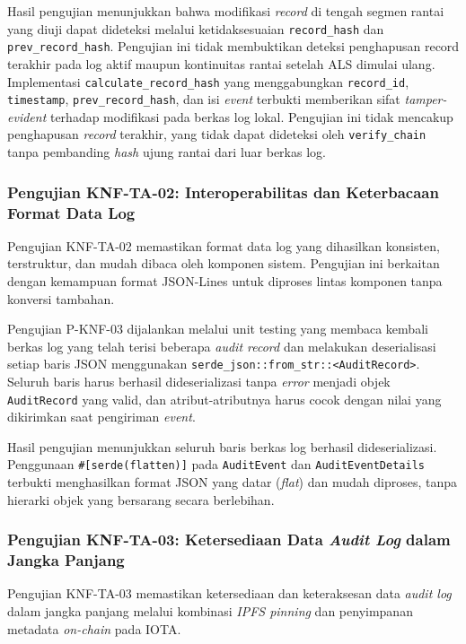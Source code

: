Hasil pengujian menunjukkan bahwa modifikasi \textit{record} di tengah segmen rantai yang diuji dapat dideteksi melalui ketidaksesuaian \texttt{record\_hash} dan \texttt{prev\_record\_hash}. Pengujian ini tidak membuktikan deteksi penghapusan record terakhir pada log aktif maupun kontinuitas rantai setelah ALS dimulai ulang. Implementasi \texttt{calculate\_record\_hash} yang menggabungkan
\texttt{record\_id}, \texttt{timestamp}, \texttt{prev\_record\_hash}, dan isi
\textit{event} terbukti memberikan sifat \textit{tamper-evident} terhadap
modifikasi pada berkas log lokal. Pengujian ini tidak mencakup penghapusan
\textit{record} terakhir, yang tidak dapat dideteksi oleh \texttt{verify\_chain}
tanpa pembanding \textit{hash} ujung rantai dari luar berkas log.

\subsubsection{Pengujian KNF-TA-02: Interoperabilitas dan Keterbacaan Format Data Log}

Pengujian KNF-TA-02 memastikan format data log yang dihasilkan konsisten, terstruktur, dan mudah dibaca oleh komponen sistem. Pengujian ini berkaitan dengan kemampuan format JSON-Lines untuk diproses lintas komponen tanpa konversi tambahan.

Pengujian P-KNF-03 dijalankan melalui unit testing yang membaca kembali berkas log yang telah terisi beberapa \textit{audit record} dan melakukan deserialisasi setiap baris JSON menggunakan \texttt{serde\_json::from\_str::<AuditRecord>}. Seluruh baris harus berhasil dideserializasi tanpa \textit{error} menjadi objek \texttt{AuditRecord} yang valid, dan atribut-atributnya harus cocok dengan nilai yang dikirimkan saat pengiriman \textit{event}.

Hasil pengujian menunjukkan seluruh baris berkas log berhasil dideserializasi. Penggunaan \texttt{\#[serde(flatten)]} pada \texttt{AuditEvent} dan \texttt{AuditEventDetails} terbukti menghasilkan format JSON yang datar (\textit{flat}) dan mudah diproses, tanpa hierarki objek yang bersarang secara berlebihan.

\subsubsection{Pengujian KNF-TA-03: Ketersediaan Data \textit{Audit Log} dalam Jangka Panjang}

Pengujian KNF-TA-03 memastikan ketersediaan dan keteraksesan data \textit{audit log} dalam jangka panjang melalui kombinasi \textit{IPFS pinning} dan penyimpanan metadata \textit{on-chain} pada IOTA.

